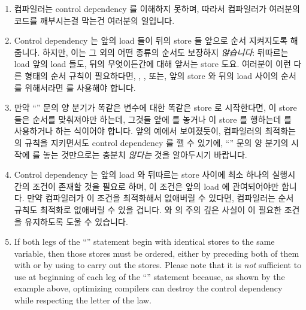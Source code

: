 \begin{enumerate}
\begin{enumerate}
\item	컴파일러는 control dependency 를 이해하지 못하며, 따라서 컴파일러가
	여러분의 코드를 깨부시는걸 막는건 여러분의 일입니다.

\item	Control dependency 는 앞의 load 들이 뒤의 store 들 앞으로 순서
	지켜지도록 해줍니다.
	하지만, 이는 그 외의 어떤 종류의 순서도 보장하지 \emph{않습니다}:
	뒤따르는 load 앞의 load 들도, 뒤의 무엇이든간에 대해 앞서는 store 도요.
	여러분이 이런 다른 형태의 순서 규칙이 필요하다면, ,
	, 또는, 앞의 store 와 뒤의 load 사이의 순서를 위해서라면
	 를 사용해야 합니다.

\item	만약 ``'' 문의 양 분기가 똑같은 변수에 대한 똑같은 store 로
	시작한다면, 이 store 들은 순서를 맞춰져야만 하는데, 그것들 앞에
	 를 놓거나 이 store 를 행하는데 
	를 사용하거나 하는 식이어야 합니다.
	앞의 예에서 보여졌듯이, 컴파일러의 최적화는  의 규칙을
	지키면서도 control dependency 를 깰 수 있기에, ``'' 문의 양
	분기의 시작에  를 놓는 것만으로는 충분치 \emph{않다는}
	것을 알아두시기 바랍니다.

\item	Control dependency 는 앞의 load 와 뒤따르는 store 사이에 최소 하나의
	실행시간의 조건이 존재할 것을 필요로 하며, 이 조건은 앞의 load 에
	관여되어야만 합니다.
	만약 컴파일러가 이 조건을 최적화해서 없애버릴 수 있다면, 컴파일러는
	순서 규칙도 최적화로 없애버릴 수 있을 겁니다.
	 와  의 주의 깊은 사실이 이 필요한
	조건을 유지하도록 도울 수 있습니다.
\iffalse

\item	If both legs of the ``'' statement begin with identical stores
	to the same variable, then those stores must be ordered,
	either by preceding both of them with  or by using
	 to carry out the stores.
	Please note that it is \emph{not} sufficient to use 
	at beginning of each leg of the ``'' statement because, as shown
	by the example above, optimizing compilers can destroy the control
	dependency while respecting the letter of the  law.


\end{enumerate}
\end{enumerate}
